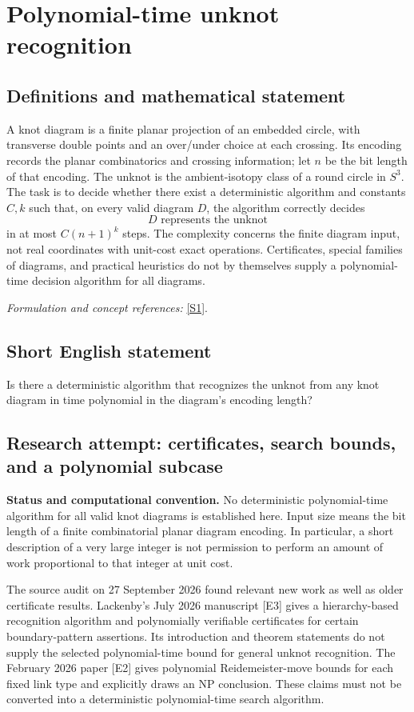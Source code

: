 \documentclass[11pt]{article}
\begin{document}
\section*{\texorpdfstring{Polynomial-time unknot recognition}{Polynomial-time unknot recognition}}\label{317}
\subsection{Definitions and mathematical statement}
A knot diagram is a finite planar projection of an embedded circle, with transverse double points and an over/under choice at each crossing. Its encoding records the planar combinatorics and crossing information; let $n$ be the bit length of that encoding. The unknot is the ambient-isotopy class of a round circle in $S^3$. The task is to decide whether there exist a deterministic algorithm and constants $C,k$ such that, on every valid diagram $D$, the algorithm correctly decides
\[
 D\text{ represents the unknot}
\]
in at most $C(n+1)^k$ steps. The complexity concerns the finite diagram input, not real coordinates with unit-cost exact operations. Certificates, special families of diagrams, and practical heuristics do not by themselves supply a polynomial-time decision algorithm for all diagrams.
\par\smallskip\textit{Formulation and concept references:} \href{https://arxiv.org/abs/1211.1079}{[S1]}.

\subsection{Short English statement}
Is there a deterministic algorithm that recognizes the unknot from any knot diagram in time polynomial in the diagram's encoding length?
\subsection{Research attempt: certificates, search bounds, and a polynomial subcase}
\textbf{Status and computational convention.} No deterministic polynomial-time algorithm for all valid knot diagrams is established here. Input size means the bit length of a finite combinatorial planar diagram encoding. In particular, a short description of a very large integer is not permission to perform an amount of work proportional to that integer at unit cost.

The source audit on 27 September 2026 found relevant new work as well as older certificate results. Lackenby's July 2026 manuscript [E3] gives a hierarchy-based recognition algorithm and polynomially verifiable certificates for certain boundary-pattern assertions. Its introduction and theorem statements do not supply the selected polynomial-time bound for general unknot recognition. The February 2026 paper [E2] gives polynomial Reidemeister-move bounds for each fixed link type and explicitly draws an NP conclusion. These claims must not be converted into a deterministic polynomial-time search algorithm.
\end{document}
